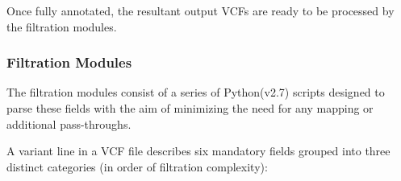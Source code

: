 
Once fully annotated, the resultant output VCFs are ready to be processed by the filtration modules.



\subsubsection{Filtration Modules}

The filtration modules consist of a series of Python(v2.7) scripts designed to parse these fields with the aim of minimizing the need for any mapping or additional pass-throughs.

A variant line in a VCF file describes six mandatory fields grouped into three distinct categories (in order of filtration complexity):

